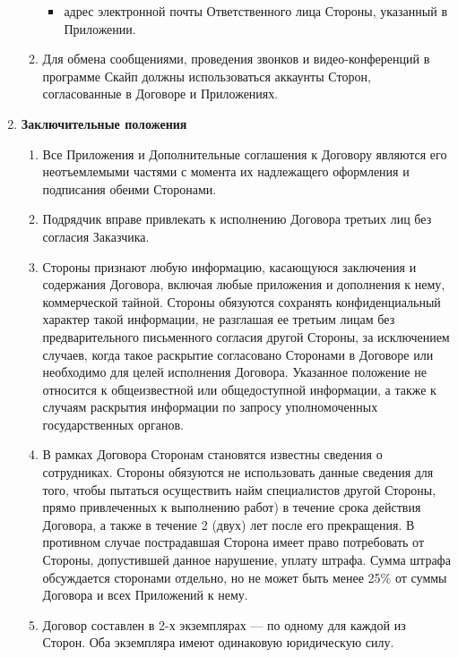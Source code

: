 \documentclass[14pt,a4paper]{article}
\begin{document}
\begin{enumerate}
\begin{enumerate}
\begin{itemize}
			\item адрес электронной почты Ответственного лица Стороны, указанный в Приложении.
		\end{itemize}

		\item Для обмена сообщениями, проведения звонков и видео-конференций в программе Скайп должны использоваться аккаунты Сторон, согласованные в Договоре и Приложениях.
	\end{enumerate}

	\item
	\begin{center}
	\textbf{Заключительные положения}
	\end{center}
	\begin{enumerate}
		\item Все Приложения и Дополнительные соглашения к Договору являются его неотъемлемыми частями с момента их надлежащего оформления и подписания обеими Сторонами.

		\item Подрядчик вправе привлекать к исполнению Договора третьих лиц без согласия Заказчика.

		\item Стороны признают любую информацию, касающуюся заключения и содержания Договора, включая любые приложения и дополнения к нему, коммерческой тайной. Стороны обязуются сохранять конфиденциальный характер такой информации, не разглашая ее третьим лицам без предварительного письменного согласия другой Стороны, за исключением случаев, когда такое раскрытие согласовано Сторонами в Договоре или необходимо для целей исполнения Договора. Указанное положение не относится к общеизвестной или общедоступной информации, а также к случаям раскрытия информации по запросу уполномоченных государственных органов.

		\item В рамках Договора Сторонам становятся известны сведения о сотрудниках. Стороны обязуются не использовать данные сведения для того, чтобы пытаться осуществить найм специалистов другой Стороны, прямо привлеченных к выполнению работ) в течение срока действия Договора, а также в течение 2 (двух) лет после его прекращения. В противном случае пострадавшая Сторона имеет право потребовать от Стороны, допустившей данное нарушение, уплату штрафа. Сумма штрафа обсуждается сторонами отдельно, но не может быть менее 25\% от суммы Договора и всех Приложений к нему.

		\item Договор составлен в 2-х экземплярах — по одному для каждой из Сторон. Оба экземпляра имеют одинаковую юридическую силу.
	\end{enumerate}


\end{enumerate}
\end{document}
